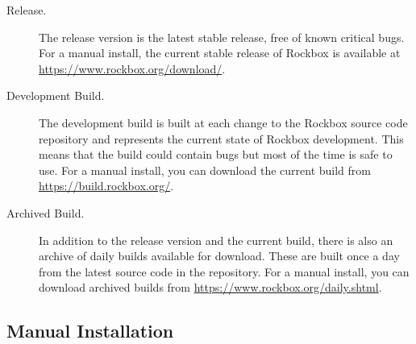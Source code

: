 \begin{description}

\item[Release.] The release version is the latest stable release, free
   of known critical bugs. For a manual install, the current stable release of Rockbox is
   available at \url{https://www.rockbox.org/download/}.

\item[Development Build.] The development build is built at each change to
  the Rockbox source code repository and represents the current state of Rockbox
  development. This means that the build could contain bugs but most of
  the time is safe to use. For a manual install, you can download the current build from
  \url{https://build.rockbox.org/}.

\item[Archived Build.] In addition to the release version and the current build,
  there is also an archive of daily builds available for download. These are
  built once a day from the latest source code in the repository. For a manual install,
  you can download archived builds from \url{https://www.rockbox.org/daily.shtml}.

\end{description}



\subsection{Manual Installation}




